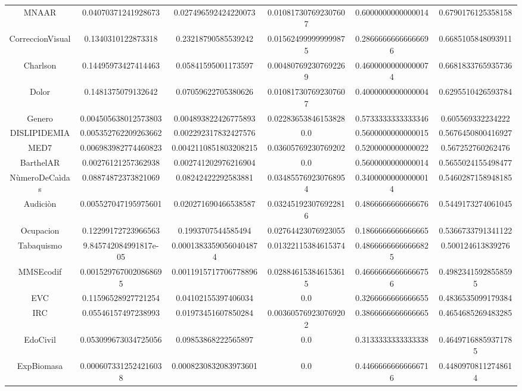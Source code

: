 \documentclass[11pt]{article}
\begin{document}
\begin{table}
\begin{tabular}{|c|SSSSS|}
MNAAR & 0.04070371241928673 & 0.027496592424220073 & 0.010817307692307607 & 0.6000000000000014 & 0.6790176125358158\\
CorreccionVisual & 0.1340310122873318 & 0.23218790585539242 & 0.015624999999999875 & 0.28666666666666696 & 0.6685105848093911\\
Charlson & 0.14495973427414463 & 0.05841595001173597 & 0.004807692307692269 & 0.46000000000000074 & 0.6681833765935736\\ 
Dolor & 0.1481375079132642 & 0.07059622705380626 & 0.010817307692307607 & 0.4000000000000004 & 0.6295510426593784\\
Genero & 0.004505638012573803 & 0.004893822426775893 & 0.02283653846153828 & 0.5733333333333346 & 0.605569332234222\\
DISLIPIDEMIA & 0.005352762209263662 & 0.002292317832427576 & 0.0 & 0.5600000000000015 & 0.5676450800416927\\
MED7 & 0.006983982774460823 & 0.0042110851803208215 & 0.03605769230769202 & 0.5200000000000022 & 0.567252760262476\\
BarthelAR & 0.00276121257362938 & 0.002741202976216904 & 0.0 & 0.5600000000000014 & 0.5655024155498477\\
NùmeroDeCaìdas & 0.08874872373821069 & 0.08242422292583881 & 0.034855769230768954 & 0.34000000000000014 & 0.5460287158948185\\
Audiciòn & 0.005527047195975601 &0.020271690466538587 & 0.032451923076922816 & 0.4866666666666676 & 0.5449173274061045\\
Ocupacion & 0.12299172723966563 & 0.1993707544585494 & 0.02764423076923055 & 0.1866666666666665 & 0.5366733791341122\\ 
Tabaquismo & 9.845742084991817e-05& 0.00013833590560404874 & 0.01322115384615374 & 0.48666666666666825 & 0.500124613839276\\
MMSEcodif &0.0015297670020868695  & 0.0011915717706778896 & 0.028846153846153615 & 0.46666666666666756 &  0.49823415928558595\\ 
EVC & 0.11596528927721254 & 0.04102155397406034 & 0.0 & 0.3266666666666655 & 0.4836535099179384\\
IRC & 0.05546157497238993 & 0.01973451607850284 & 0.003605769230769202 & 0.3866666666666665 & 0.4654685269483285\\
EdoCivil & 0.053099673034725056 & 0.09853868222565897 & 0.0 & 0.3133333333333338 & 0.46497168859371785\\
ExpBiomasa & 0.0006073312524216038 & 0.0008230832083973601 & 0.0 & 0.44666666666666716 & 0.44809708112748614\\ 

\end{tabular}
\end{table}
\end{document}
